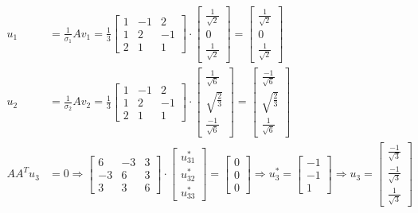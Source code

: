 \documentclass[a4paper, spanish]{article}
\begin{document}
  \begin{align}
    u_1 &=
    \frac{1}{\sigma_1}Av_1 =
    \frac{1}{3}
    \begin{bmatrix}
      1 & -1 & 2\\
      1 & 2 & -1\\
      2 & 1 & 1
    \end{bmatrix}
    \cdot
    \begin{bmatrix}
      \frac{1}{\sqrt{2}} \\
      0 \\
      \frac{1}{\sqrt{2}}
    \end{bmatrix}
    =
    \begin{bmatrix}
      \frac{1}{\sqrt{2}} \\
      0 \\
      \frac{1}{\sqrt{2}}
    \end{bmatrix} \\
    u_2 &=
    \frac{1}{\sigma_2}Av_2 =
    \frac{1}{3}
    \begin{bmatrix}
      1 & -1 & 2\\
      1 & 2 & -1\\
      2 & 1 & 1
    \end{bmatrix}
    \cdot
    \begin{bmatrix}
      \frac{1}{\sqrt{6}} \\
      \sqrt{\frac{2}{3}} \\
      \frac{-1}{\sqrt{6}}
    \end{bmatrix}
    =
    \begin{bmatrix}
      \frac{-1}{\sqrt{6}} \\
      \sqrt{\frac{2}{3}} \\
      \frac{1}{\sqrt{6}}
    \end{bmatrix}\\
    A A^T u_3 &= 0
    \Rightarrow
    \begin{bmatrix}
      6 & -3 & 3 \\
      -3 & 6 & 3 \\
      3 & 3 & 6
    \end{bmatrix}
    \cdot
    \begin{bmatrix}
      u_{31}^* \\
      u_{32}^* \\
      u_{33}^*
    \end{bmatrix}
    =
    \begin{bmatrix}
      0 \\
      0 \\
      0
    \end{bmatrix}
    \Rightarrow
    u_3^* =
    \begin{bmatrix}
      -1 \\
      -1 \\
      1
    \end{bmatrix}
    \Rightarrow
    u_3 =
    \begin{bmatrix}
      \frac{-1}{\sqrt{3}} \\
      \frac{-1}{\sqrt{3}} \\
      \frac{1}{\sqrt{3}}
    \end{bmatrix}
  \end{align}
\end{document}
